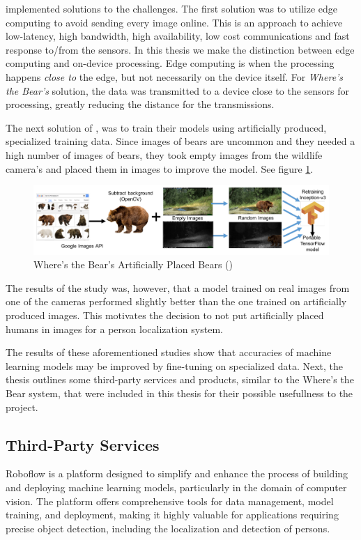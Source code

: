 \citeauthor{el2017WTB} implemented solutions to the challenges. The first solution was to utilize edge computing to avoid sending every image online. This is an approach to achieve low-latency, high bandwidth, high availability, low cost communications and fast response to/from the sensors. In this thesis we make the distinction between edge computing and on-device processing. Edge computing is when the processing happens \textit{close to} the edge, but not necessarily on the device itself. For \textit{Where's the Bear's} solution, the data was transmitted to a device close to the sensors for processing, greatly reducing the distance for the transmissions. 

The next solution of \citeauthor{el2017WTB}, was to train their models using artificially produced, specialized training data. Since images of bears are uncommon and they needed a high number of images of bears, they took empty images from the wildlife camera's and placed them in images to improve the model. See figure \ref{fig:wtb_bears}.

\begin{figure}[H]
    \centering
    \includegraphics[width=\linewidth]{Images/artificial_bears.png}
    \caption{Where's the Bear's Artificially Placed Bears (\cite{el2017WTB})} 
    \label{fig:wtb_bears}
\end{figure}

The results of the study was, however, that a model trained on real images from one of the cameras performed slightly better than the one trained on artificially produced images. This motivates the decision to not put artificially placed humans in images for a person localization system. 

The results of these aforementioned studies show that accuracies of machine learning models may be improved by fine-tuning on specialized data. Next, the thesis outlines some third-party services and products, similar to the Where's the Bear system, that were included in this thesis for their possible usefullness to the project.

\subsection{Third-Party Services}
\label{sec:thirdparty}
Roboflow is a platform designed to simplify and enhance the process of building and deploying machine learning models, particularly in the domain of computer vision. The platform offers comprehensive tools for data management, model training, and deployment, making it highly valuable for applications requiring precise object detection, including the localization and detection of persons.

